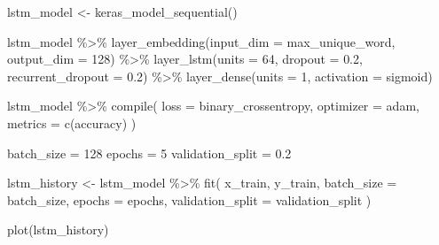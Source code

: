 \documentclass[
  12pt,
]{krantz}
\makeatletter
\newenvironment{Shaded}{\begin{snugshade}}{\end{snugshade}}
\newcommand{\AttributeTok}[1]{\textcolor[rgb]{0.61,0.61,0.61}{#1}}
\newcommand{\DecValTok}[1]{\textcolor[rgb]{0.06,0.06,0.06}{#1}}
\newcommand{\FloatTok}[1]{\textcolor[rgb]{0.06,0.06,0.06}{#1}}
\newcommand{\FunctionTok}[1]{\textcolor[rgb]{0,0,0}{#1}}
\newcommand{\NormalTok}[1]{#1}
\newcommand{\OtherTok}[1]{\textcolor[rgb]{0.37,0.37,0.37}{#1}}
\newcommand{\SpecialCharTok}[1]{\textcolor[rgb]{0,0,0}{#1}}
\newcommand{\StringTok}[1]{\textcolor[rgb]{0.5,0.5,0.5}{#1}}
\newenvironment{kframe}{%
\medskip{}
\setlength{\fboxsep}{.8em}
 \def\at@end@of@kframe{}%
 \ifinner\ifhmode%
  \def\at@end@of@kframe{\end{minipage}}%
  \begin{minipage}{\columnwidth}%
 \fi\fi%
 \def\FrameCommand##1{\hskip\@totalleftmargin \hskip-\fboxsep
 \colorbox{shadecolor}{##1}\hskip-\fboxsep
     \hskip-\linewidth \hskip-\@totalleftmargin \hskip\columnwidth}%
 \MakeFramed {\advance\hsize-\width
   \@totalleftmargin\z@ \linewidth\hsize
   \@setminipage}}%
 {\par\unskip\endMakeFramed%
 \at@end@of@kframe}
\renewenvironment{Shaded}{\begin{kframe}}{\end{kframe}}
\makeatother
\begin{document}
\begin{Shaded}
\begin{Highlighting}[]
\NormalTok{lstm\_model }\OtherTok{\textless{}{-}} \FunctionTok{keras\_model\_sequential}\NormalTok{()}

\NormalTok{lstm\_model }\SpecialCharTok{\%\textgreater{}\%}
  \FunctionTok{layer\_embedding}\NormalTok{(}\AttributeTok{input\_dim =}\NormalTok{ max\_unique\_word, }\AttributeTok{output\_dim =} \DecValTok{128}\NormalTok{) }\SpecialCharTok{\%\textgreater{}\%}
  \FunctionTok{layer\_lstm}\NormalTok{(}\AttributeTok{units =} \DecValTok{64}\NormalTok{, }\AttributeTok{dropout =} \FloatTok{0.2}\NormalTok{, }\AttributeTok{recurrent\_dropout =} \FloatTok{0.2}\NormalTok{) }\SpecialCharTok{\%\textgreater{}\%}
  \FunctionTok{layer\_dense}\NormalTok{(}\AttributeTok{units =} \DecValTok{1}\NormalTok{, }\AttributeTok{activation =} \StringTok{\textquotesingle{}sigmoid\textquotesingle{}}\NormalTok{)}

\NormalTok{lstm\_model }\SpecialCharTok{\%\textgreater{}\%} \FunctionTok{compile}\NormalTok{(}
  \AttributeTok{loss =} \StringTok{\textquotesingle{}binary\_crossentropy\textquotesingle{}}\NormalTok{,}
  \AttributeTok{optimizer =} \StringTok{\textquotesingle{}adam\textquotesingle{}}\NormalTok{,}
  \AttributeTok{metrics =} \FunctionTok{c}\NormalTok{(}\StringTok{\textquotesingle{}accuracy\textquotesingle{}}\NormalTok{)}
\NormalTok{)}

\NormalTok{batch\_size }\OtherTok{=} \DecValTok{128}
\NormalTok{epochs }\OtherTok{=} \DecValTok{5}
\NormalTok{validation\_split }\OtherTok{=} \FloatTok{0.2}

\NormalTok{lstm\_history }\OtherTok{\textless{}{-}}\NormalTok{ lstm\_model }\SpecialCharTok{\%\textgreater{}\%} \FunctionTok{fit}\NormalTok{(}
\NormalTok{  x\_train, y\_train,}
  \AttributeTok{batch\_size =}\NormalTok{ batch\_size,}
  \AttributeTok{epochs =}\NormalTok{ epochs,}
  \AttributeTok{validation\_split =}\NormalTok{ validation\_split}
\NormalTok{)}
\end{Highlighting}
\end{Shaded}

\begin{Shaded}
\begin{Highlighting}[]
\FunctionTok{plot}\NormalTok{(lstm\_history)}
\end{Highlighting}
\end{Shaded}
\end{document}
